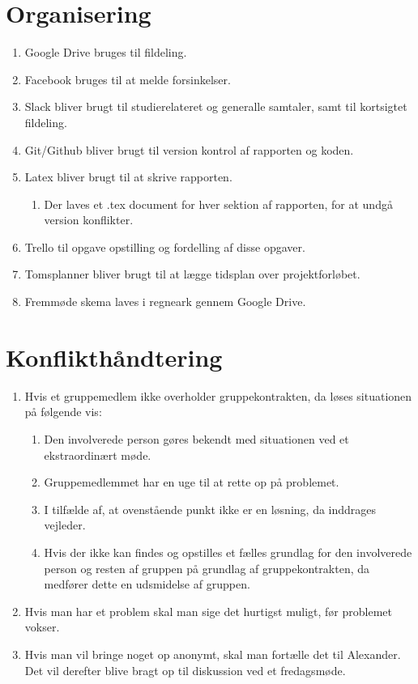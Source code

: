 \section{Organisering}
\begin{enumerate}
\item Google Drive bruges til fildeling.
\item Facebook bruges til at melde forsinkelser.
\item Slack bliver brugt til studierelateret og generalle samtaler, samt til kortsigtet fildeling.
\item Git/Github bliver brugt til version kontrol af rapporten og koden.
\item Latex bliver brugt til at skrive rapporten.
\begin{enumerate}
\item Der laves et .tex document for hver sektion af rapporten, for at undgå version konflikter.
\end{enumerate}
\item Trello til opgave opstilling og fordelling af disse opgaver.
\item Tomsplanner bliver brugt til at lægge tidsplan over projektforløbet.
\item Fremmøde skema laves i regneark gennem Google Drive.
\end{enumerate}

\section{Konflikthåndtering}
\begin{enumerate}
\item Hvis et gruppemedlem ikke overholder gruppekontrakten, da løses situationen på følgende vis:
\begin{enumerate}
\item Den involverede person gøres bekendt med situationen ved et ekstraordinært møde.
\item Gruppemedlemmet har en uge til at rette op på problemet.
\item I tilfælde af, at ovenstående punkt ikke er en løsning, da inddrages vejleder.
\item Hvis der ikke kan findes og opstilles et fælles grundlag for den involverede person og resten af gruppen på grundlag af gruppekontrakten, da medfører dette en udsmidelse af gruppen.
\end{enumerate}
\item Hvis man har et problem skal man sige det hurtigst muligt, før problemet vokser.
\item Hvis man vil bringe noget op anonymt, skal man fortælle det til Alexander. Det vil derefter blive bragt op til diskussion ved et fredagsmøde.
\end{enumerate}

